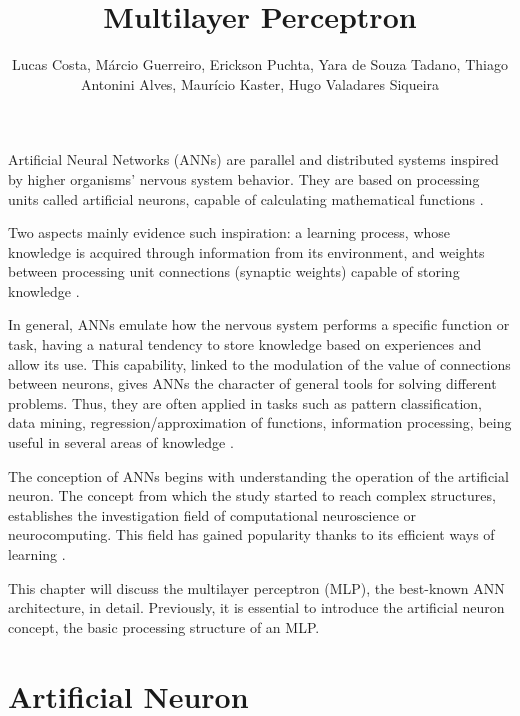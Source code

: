 \title{Multilayer Perceptron}
\label{chp:multilayer-perceptron}
\author{Lucas Costa, Márcio Guerreiro, Erickson Puchta, Yara de Souza Tadano, Thiago Antonini Alves, Maurício Kaster, Hugo Valadares Siqueira}
\institute{}
\maketitle


\maketitle

Artificial Neural Networks (ANNs) are parallel and distributed systems inspired by higher organisms' nervous system %
behavior. They are based on processing units called artificial neurons, capable of calculating mathematical functions \cite{haykin}.

Two aspects mainly evidence such inspiration: a learning process, whose knowledge is acquired through information from its environment, and weights between processing unit connections (synaptic weights) capable of storing knowledge \cite{Castro2006FundamentalsON}.

In general, ANNs emulate how the nervous system performs a specific function or task, having a natural %
tendency to store knowledge based on experiences and allow its use. This capability, linked to the modulation of the value of connections between neurons, gives ANNs the character of general tools for solving different problems. Thus, they are often applied in tasks such as pattern classification, data mining, regression/approximation of functions, information processing, being useful in several areas of knowledge \cite{haykin}.

The conception of ANNs begins with understanding the %
operation
of the artificial neuron. The concept from which the study started to reach complex structures, %
establishes the investigation field of computational neuroscience or neurocomputing. This field has gained popularity thanks to its efficient ways of learning \cite{Russell2009}.

This chapter will discuss the multilayer perceptron (MLP), the best-known ANN architecture, in detail. %
Previously, it is essential to introduce the artificial neuron concept, 
the basic processing structure of an MLP.

\section{Artificial Neuron}
\label{sec:neuronio}

